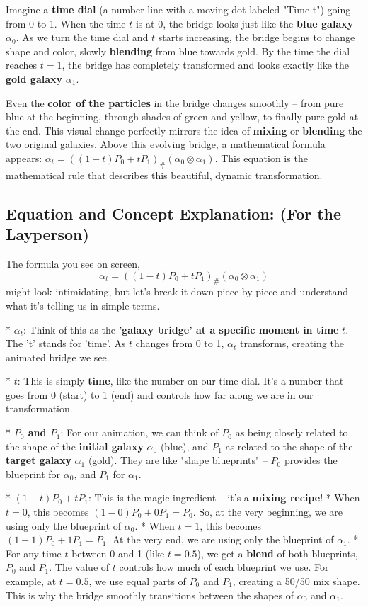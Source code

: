 \documentclass{article}
\begin{document}
Imagine a \textbf{time dial} (a number line with a moving dot labeled "Time t") going from 0 to 1.  When the time \( t \) is at 0, the bridge looks just like the \textbf{blue galaxy} \( \alpha_0 \). As we turn the time dial and \( t \) starts increasing, the bridge begins to change shape and color, slowly \textbf{blending} from blue towards gold. By the time the dial reaches \( t=1 \), the bridge has completely transformed and looks exactly like the \textbf{gold galaxy} \( \alpha_1 \).

Even the \textbf{color of the particles} in the bridge changes smoothly – from pure blue at the beginning, through shades of green and yellow, to finally pure gold at the end. This visual change perfectly mirrors the idea of \textbf{mixing} or \textbf{blending} the two original galaxies. Above this evolving bridge, a mathematical formula appears: \( \alpha_t = ((1 - t)P_0 + tP_1)_{\#} (\alpha_0 \otimes \alpha_1) \).  This equation is the mathematical rule that describes this beautiful, dynamic transformation.

\subsection*{Equation and Concept Explanation: (For the Layperson)}

The formula you see on screen,
\[
\alpha_t = ((1 - t)P_0 + tP_1)_{\#} (\alpha_0 \otimes \alpha_1)
\]
might look intimidating, but let's break it down piece by piece and understand what it's telling us in simple terms.

*   \textbf{\( \alpha_t \)}:  Think of this as the \textbf{'galaxy bridge' at a specific moment in time} \( t \).  The 't' stands for 'time'.  As \( t \) changes from 0 to 1, \( \alpha_t \) transforms, creating the animated bridge we see.

*   \textbf{\( t \)}:  This is simply \textbf{time}, like the number on our time dial. It's a number that goes from 0 (start) to 1 (end) and controls how far along we are in our transformation.

*   \textbf{\( P_0 \) and \( P_1 \)}:  For our animation, we can think of \( P_0 \) as being closely related to the shape of the \textbf{initial galaxy} \( \alpha_0 \) (blue), and \( P_1 \) as related to the shape of the \textbf{target galaxy} \( \alpha_1 \) (gold).  They are like "shape blueprints" – \( P_0 \) provides the blueprint for \( \alpha_0 \), and \( P_1 \) for \( \alpha_1 \).

*   \textbf{\( (1 - t)P_0 + tP_1 \)}: This is the magic ingredient – it's a \textbf{mixing recipe}!
    *   When \( t = 0 \), this becomes \( (1 - 0)P_0 + 0P_1 = P_0 \). So, at the very beginning, we are using only the blueprint of \( \alpha_0 \).
    *   When \( t = 1 \), this becomes \( (1 - 1)P_0 + 1P_1 = P_1 \). At the very end, we are using only the blueprint of \( \alpha_1 \).
    *   For any time \( t \) between 0 and 1 (like \( t = 0.5 \)), we get a \textbf{blend} of both blueprints, \( P_0 \) and \( P_1 \). The value of \( t \) controls how much of each blueprint we use. For example, at \( t = 0.5 \), we use equal parts of \( P_0 \) and \( P_1 \), creating a 50/50 mix shape.  This is why the bridge smoothly transitions between the shapes of \( \alpha_0 \) and \( \alpha_1 \).
\end{document}
